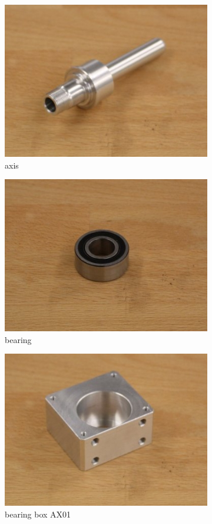 	\begin{figure}
		\centering
		\begin{subfigure}{.3\textwidth}
  			\centering
  			\includegraphics[width=.5\linewidth]{images/axis}
  			\caption{axis \cite{github_robocup@work}}
  			\label{fig:axis}
			\end{subfigure}%
		\begin{subfigure}{.3\textwidth}
  			\centering
  			\includegraphics[width=.5\linewidth]{images/bearing}
  			\caption{bearing \cite{github_robocup@work}}
  			\label{fig:bearing}
		\end{subfigure}
		\begin{subfigure}{.3\textwidth}
  			\centering
  			\includegraphics[width=.5\linewidth]{images/bearingBoxAX01}
  			\caption{bearing box AX01 \cite{github_robocup@work}}
  			\label{fig:bearingBoxAX01}
		\end{subfigure}\\
		\vspace{3mm}
		\begin{subfigure}{.3\textwidth}

\end{subfigure}
\end{figure}
